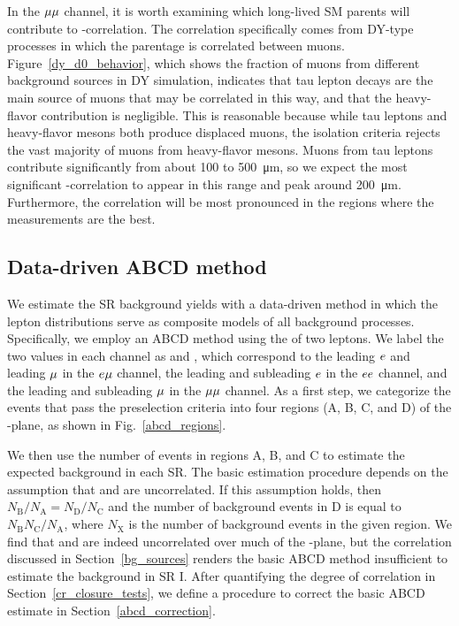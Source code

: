In the ${\mu}{\mu}$ channel, it is worth examining which long-lived SM parents will contribute to \ad-\ad correlation. The correlation specifically comes from DY-type processes in which the parentage is correlated between muons. Figure~\ref{dy_d0_behavior}, which shows the fraction of muons from different background sources in DY simulation, indicates that tau lepton decays are the main source of muons that may be correlated in this way, and that the heavy-flavor contribution is negligible. This is reasonable because while tau leptons and heavy-flavor mesons both produce displaced muons, the isolation criteria rejects the vast majority of muons from heavy-flavor mesons.  Muons from tau leptons contribute significantly from about \num{100} to \SI{500}{\um}, so we expect the most significant \ad-\ad correlation to appear in this range and peak around \SI{200}{\um}. Furthermore, the correlation will be most pronounced in the regions where the \ad measurements are the best.



\subsection{Data-driven ABCD method}
\label{abcd}
We estimate the SR background yields with a data-driven method in which the lepton \ad distributions serve as composite models of all background processes. Specifically, we employ an ABCD method using the \ad of two leptons. We label the two \ad values in each channel as \ada and \adb, which correspond to the leading $e$ and leading ${\mu}$ in the $e{\mu}$ channel, the leading and subleading $e$ in the $ee$ channel, and the leading and subleading ${\mu}$ in the ${\mu}{\mu}$ channel. As a first step, we categorize the events that pass the preselection criteria into four regions (A, B, C, and D) of the \ada-\adb plane, as shown in Fig.~\ref{abcd_regions}.



We then use the number of events in regions A, B, and C to estimate the expected background in each SR. The basic estimation procedure depends on the assumption that \ada and \adb are uncorrelated. If this assumption holds, then $N_{\text{B}}/N_{\text{A}}=N_{\text{D}}/N_{\text{C}}$ and the number of background events in D is equal to $N_{\text{B}}N_{\text{C}}/N_{\text{A}}$, where $N_{\text{X}}$ is the number of background events in the given region. We find that \ada and \adb are indeed uncorrelated over much of the \ad-\ad plane, but the correlation discussed in Section~\ref{bg_sources} renders the basic ABCD method insufficient to estimate the background in SR I. After quantifying the degree of correlation in Section~\ref{cr_closure_tests}, we define a procedure to correct the basic ABCD estimate in Section~\ref{abcd_correction}.

